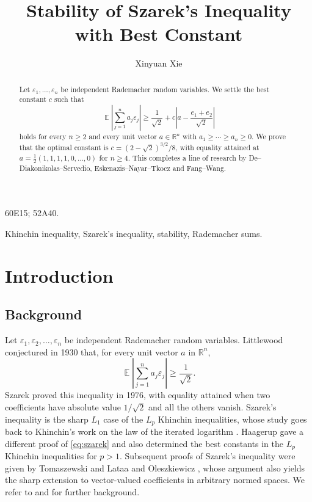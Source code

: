 \documentclass[a4paper,twoside,11pt,reqno]{amsart}
\author{Xinyuan Xie}
\title{Stability of Szarek's Inequality with Best Constant}
\theoremstyle{definition}
\theoremstyle{remark}
\newcommand{\1}{\mathbbm{1}}
\newcommand{\R}{\mathbb{R}}
\DeclareMathOperator{\E}{\mathbb{E}}
\def \R {\mathbb{R}}
\begin{document}
    \maketitle
	
    \begin{abstract}
Let $\varepsilon_1,\ldots,\varepsilon_n$ be independent Rademacher random variables. We settle the best constant $c$ such that
\[
 \E\left|\sum_{j=1}^n a_j\varepsilon_j\right|
 \ge\frac1{\sqrt2}+c\left|a-\frac{e_1+e_2}{\sqrt2}\right|
\]
holds for every $n\ge2$ and every unit vector $a\in\R^n$ with $a_1\ge\cdots\ge a_n\ge0$. We prove that the optimal constant is $c=(2-\sqrt2)^{3/2}/8$, with equality attained at $a=\frac12(1,1,1,1,0,\ldots,0)$ for $n\ge4$. This completes a line of research by De--Diakonikolas--Servedio, Eskenazis--Nayar--Tkocz and Fang--Wang.
\end{abstract}

\bigskip

{\footnotesize
{} 60E15; 52A40.

 Khinchin inequality, Szarek's inequality, stability, Rademacher sums.
}

\section{Introduction}
\subsection{Background}
Let $\varepsilon_1,\varepsilon_2,\ldots,\varepsilon_n$ be independent Rademacher random variables. Littlewood \cite{Lit30} conjectured in 1930 that, for every unit vector $a$ in $\R^n$,
\begin{equation}\label{eq:szarek}
 \E\left|\sum_{j=1}^n a_j\varepsilon_j\right|
 \ge\frac1{\sqrt2}.
\end{equation}
Szarek \cite{Sza76} proved this inequality in 1976, with equality attained when two coefficients have absolute value $1/\sqrt2$ and all the others vanish. Szarek's inequality is the sharp $L_1$ case of the $L_p$ Khinchin inequalities, whose study goes back to Khinchin's work on the law of the iterated logarithm \cite{Khi23}. Haagerup \cite{Haa81} gave a different proof of \eqref{eq:szarek} and also determined the best constants in the $L_p$ Khinchin inequalities for $p>1$. Subsequent proofs of Szarek's inequality were given by Toma\-szew\-ski \cite{Tom87} and Lata{}a and Oleszkiewicz \cite{LO94}, whose argument also yields the sharp extension to vector-valued coefficients in arbitrary normed spaces. We refer to \cite[Section~3.3]{NT23} and \cite{ENTDist24} for further background.
\end{document}
